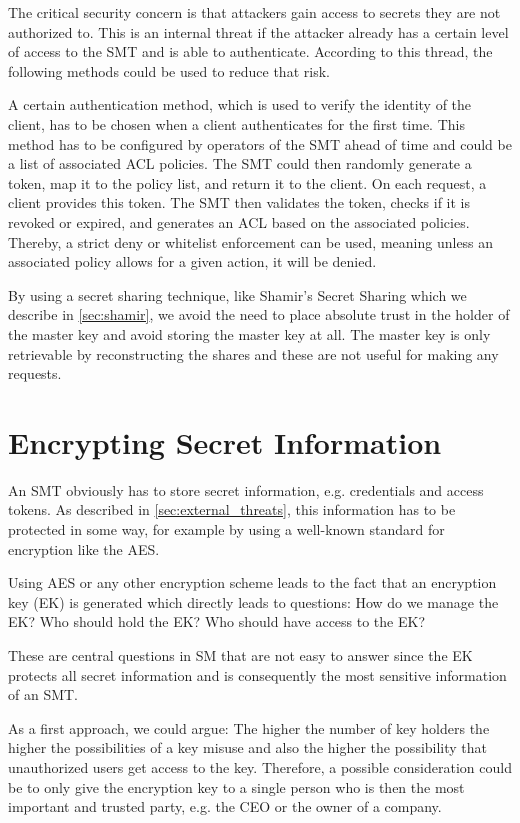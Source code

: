 \documentclass[runningheads]{llncs}
\begin{document}
The critical security concern is that attackers gain access to secrets they are not authorized to. This is an internal threat if the attacker already has a certain level of access to the SMT and is able to authenticate. According to this thread, the following methods could be used to reduce that risk.

A certain authentication method, which is used to verify the identity of the client, has to be chosen when a client authenticates for the first time. This method has to be configured by operators of the SMT ahead of time and could be a list of associated ACL policies. The SMT could then randomly generate a token, map it to the policy list, and return it to the client. On each request, a client provides this token. The SMT then validates the token, checks if it is revoked or expired, and generates an ACL based on the associated policies. Thereby, a strict deny or whitelist enforcement can be used, meaning unless an associated policy allows for a given action, it will be denied.

By using a secret sharing technique, like Shamir's Secret Sharing which we describe in \autoref{sec:shamir}, we avoid the need to place absolute trust in the holder of the master key and avoid storing the master key at all. The master key is only retrievable by reconstructing the shares and these are not useful for making any requests.

\section{Encrypting Secret Information}
\label{sec:external_threats}

An SMT obviously has to store secret information, e.g. credentials and access tokens. As described in \autoref{sec:external_threats}, this information has to be protected in some way, for example by using a well-known standard for encryption like the AES.

Using AES or any other encryption scheme leads to the fact that an encryption key (EK) is generated which directly leads to questions: How do we manage the EK? Who should hold the EK? Who should have access to the EK?

These are central questions in SM that are not easy to answer since the EK protects all secret information and is consequently the most sensitive information of an SMT.

As a first approach, we could argue: The higher the number of key holders the higher the possibilities of a key misuse and also the higher the possibility that unauthorized users get access to the key. Therefore, a possible consideration could be to only give the encryption key to a single person who is then the most important and trusted party, e.g. the CEO or the owner of a company. 
\end{document}
